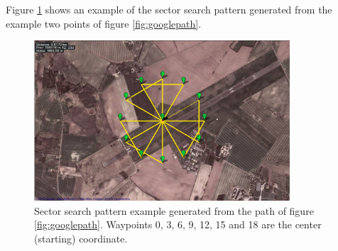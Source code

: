 Figure \ref{fig:sector} shows an example of the sector search pattern generated from the example
two points of figure \ref{fig:googlepath}.
\begin{figure}[ht]
	\centering
	\includegraphics[width=0.85\textwidth]{Images/sector}
	\caption[Sector search pattern example.]{Sector search pattern example generated from the path of figure
		\ref{fig:googlepath}. Waypoints 0, 3, 6, 9, 12, 15 and 18 are the center (starting) coordinate.}
	\label{fig:sector}
\end{figure}

\newpage